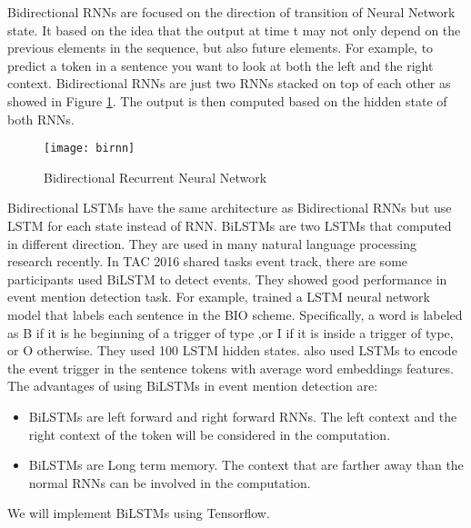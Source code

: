 \indent Bidirectional RNNs are focused on the direction of transition of Neural Network state. It based on the idea that the output at time t may not only depend on the previous elements in the sequence, but also future elements. For example, to predict a token in a sentence you want to look at both the left and the right context. Bidirectional RNNs are just two RNNs stacked on top of each other as showed in Figure \ref{fig:birnn}. The output is then computed based on the hidden state of both RNNs.\\
\begin{figure}
    \centering
    \texttt{[image: birnn]}
    \caption{Bidirectional Recurrent Neural Network}
    \label{fig:birnn}
\end{figure}
\indent Bidirectional LSTMs have the same architecture as Bidirectional RNNs but use LSTM for each state instead of RNN. BiLSTMs are two LSTMs that computed in different direction. They are used in many natural language processing research recently. In TAC 2016 shared tasks event track, there are some participants used BiLSTM to detect events. They showed good performance in event mention detection task. For example, \cite{zeng2016event}  trained a LSTM neural network model that labels each sentence in the BIO scheme. Speciﬁcally, a word is labeled as B if it is he beginning of a trigger of type ,or I if it is inside a trigger of type, or O otherwise.  They used 100 LSTM hidden states. \cite{mihaylov2016event} also used LSTMs to encode the event trigger in the sentence tokens with average word embeddings features. \\
\indent The advantages of using BiLSTMs in event mention detection are: 
\begin{itemize}
\item BiLSTMs are left forward and right forward RNNs. The left context and the right context of the token will be considered in the computation. 
\item BiLSTMs are Long term memory. The context that are farther away than the normal RNNs can be involved in the computation.
\end{itemize}
We will implement BiLSTMs using Tensorflow.